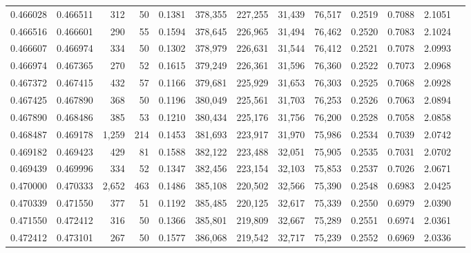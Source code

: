 \begin{tabular}{rrrrrrrrrrrrr}
0.466028 & 0.466511 &   312 &  50 &                                     0.1381 & 378,355 & 227,255 &  31,439 &  76,517 & 0.2519 & 0.7088 & 2.1051 \\
0.466516 & 0.466601 &   290 &  55 &                                     0.1594 & 378,645 & 226,965 &  31,494 &  76,462 & 0.2520 & 0.7083 & 2.1024 \\
0.466607 & 0.466974 &   334 &  50 &                                     0.1302 & 378,979 & 226,631 &  31,544 &  76,412 & 0.2521 & 0.7078 & 2.0993 \\
0.466974 & 0.467365 &   270 &  52 &                                     0.1615 & 379,249 & 226,361 &  31,596 &  76,360 & 0.2522 & 0.7073 & 2.0968 \\
0.467372 & 0.467415 &   432 &  57 &                                     0.1166 & 379,681 & 225,929 &  31,653 &  76,303 & 0.2525 & 0.7068 & 2.0928 \\
0.467425 & 0.467890 &   368 &  50 &                                     0.1196 & 380,049 & 225,561 &  31,703 &  76,253 & 0.2526 & 0.7063 & 2.0894 \\
0.467890 & 0.468486 &   385 &  53 &                                     0.1210 & 380,434 & 225,176 &  31,756 &  76,200 & 0.2528 & 0.7058 & 2.0858 \\
0.468487 & 0.469178 & 1,259 & 214 &                                     0.1453 & 381,693 & 223,917 &  31,970 &  75,986 & 0.2534 & 0.7039 & 2.0742 \\
0.469182 & 0.469423 &   429 &  81 &                                     0.1588 & 382,122 & 223,488 &  32,051 &  75,905 & 0.2535 & 0.7031 & 2.0702 \\
0.469439 & 0.469996 &   334 &  52 &                                     0.1347 & 382,456 & 223,154 &  32,103 &  75,853 & 0.2537 & 0.7026 & 2.0671 \\
0.470000 & 0.470333 & 2,652 & 463 &                                     0.1486 & 385,108 & 220,502 &  32,566 &  75,390 & 0.2548 & 0.6983 & 2.0425 \\
0.470339 & 0.471550 &   377 &  51 &                                     0.1192 & 385,485 & 220,125 &  32,617 &  75,339 & 0.2550 & 0.6979 & 2.0390 \\
0.471550 & 0.472412 &   316 &  50 &                                     0.1366 & 385,801 & 219,809 &  32,667 &  75,289 & 0.2551 & 0.6974 & 2.0361 \\
0.472412 & 0.473101 &   267 &  50 &                                     0.1577 & 386,068 & 219,542 &  32,717 &  75,239 & 0.2552 & 0.6969 & 2.0336 \\

\end{tabular}
